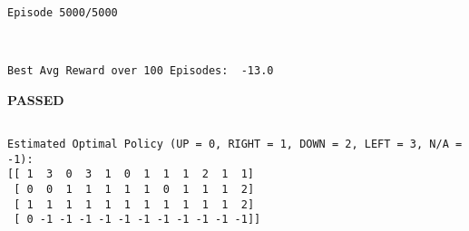 \documentclass[11pt]{article}
\begin{document}
    \begin{Verbatim}[commandchars=\\\{\}]
Episode 5000/5000
    \end{Verbatim}

    \begin{center}
    \end{center}
    { \hspace*{\fill} \\}
    
    \begin{Verbatim}[commandchars=\\\{\}]
Best Avg Reward over 100 Episodes:  -13.0

    \end{Verbatim}

    \textbf{{PASSED}}

    
    \begin{Verbatim}[commandchars=\\\{\}]

Estimated Optimal Policy (UP = 0, RIGHT = 1, DOWN = 2, LEFT = 3, N/A = -1):
[[ 1  3  0  3  1  0  1  1  1  2  1  1]
 [ 0  0  1  1  1  1  1  0  1  1  1  2]
 [ 1  1  1  1  1  1  1  1  1  1  1  2]
 [ 0 -1 -1 -1 -1 -1 -1 -1 -1 -1 -1 -1]]

    \end{Verbatim}
\end{document}
